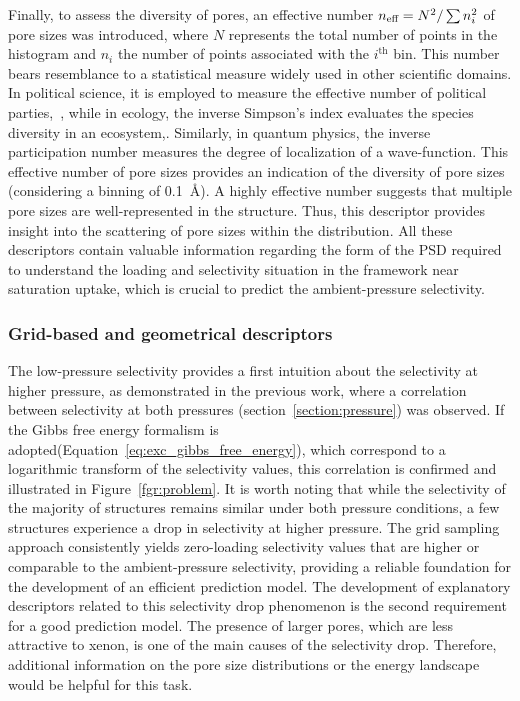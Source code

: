 \documentclass[main]{subfiles}
\begin{document}
Finally, to assess the diversity of pores, an effective number $n_{\text{eff}} = N^2/\sum n_i^2$ of pore sizes was introduced, where $N$ represents the total number of points in the histogram and $n_i$ the number of points associated with the $i^\text{th}$ bin. This number bears resemblance to a statistical measure widely used in other scientific domains. In political science, it is employed to measure the effective number of political parties,~\autocite{neffposci_Laakso1979}, while in ecology, the inverse Simpson's index evaluates the species diversity in an ecosystem,\autocite{neffbio_Simpson1949}. Similarly, in quantum physics, the inverse participation number measures the degree of localization of a wave-function.\autocite{neffphys_Kramer1993} This effective number of pore sizes provides an indication of the diversity of pore sizes (considering a binning of \SI{0.1}{\angstrom}). A highly effective number suggests that multiple pore sizes are well-represented in the structure. Thus, this descriptor provides insight into the scattering of pore sizes within the distribution.
All these descriptors contain valuable information regarding the form of the PSD required to understand the loading and selectivity situation in the framework near saturation uptake, which is crucial to predict the ambient-pressure selectivity.

\subsubsection{Grid-based and geometrical descriptors}

The low-pressure selectivity provides a first intuition about the selectivity at higher pressure, as demonstrated in the previous work, where a correlation between selectivity at both pressures (section~\ref{section:pressure}) was observed. If the Gibbs free energy formalism is adopted(Equation~\ref{eq:exc_gibbs_free_energy}), which correspond to a logarithmic transform of the selectivity values, this correlation is confirmed and illustrated in Figure~\ref{fgr:problem}. It is worth noting that while the selectivity of the majority of structures remains similar under both pressure conditions, a few structures experience a drop in selectivity at higher pressure. The grid sampling approach consistently yields zero-loading selectivity values that are higher or comparable to the ambient-pressure selectivity, providing a reliable foundation for the development of an efficient prediction model. The development of explanatory descriptors related to this selectivity drop phenomenon is the second requirement for a good prediction model. The presence of larger pores, which are less attractive to xenon, is one of the main causes of the selectivity drop. Therefore, additional information on the pore size distributions or the energy landscape would be helpful for this task.
\end{document}
